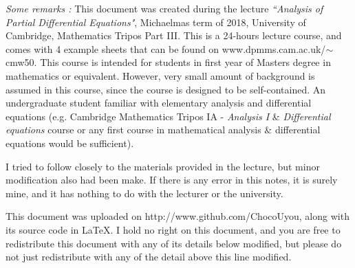\documentclass[12pt,a4paper]{report}
\begin{document}
\begin{changemargin}{1.5cm}{1.5cm}
\textit{Some remarks :} This document was created during the lecture \textit{``Analysis of Partial Differential Equations"}, Michaelmas term of 2018, University of Cambridge, Mathematics Tripos Part III. This is a 24-hours lecture course, and comes with 4 example sheets that can be found on www.dpmms.cam.ac.uk/$\sim$cmw50. This course is intended for students in first year of Masters degree in mathematics or equivalent. However, very small amount of background is assumed in this course, since the course is designed to be self-contained. An undergraduate student familiar with elementary analysis and differential equations (e.g. Cambridge Mathematics Tripos IA - \textit{Analysis I} \& \textit{Differential equations} course or any first course in mathematical analysis \& differential equations would be sufficient).
\s

I tried to follow closely to the materials provided in the lecture, but minor modification also had been make. If there is any error in this notes, it is surely mine, and it has nothing to do with the lecturer or the university.
\s

This document was uploaded on http://www.github.com/ChocoUyou, along with its source code in \LaTeX. I hold no right on this document, and you are free to redistribute this document with any of its details below modified, but please do not just redistribute with any of the detail above this line modified.
\end{changemargin}

\newpage

\newday
\s
\end{document}
